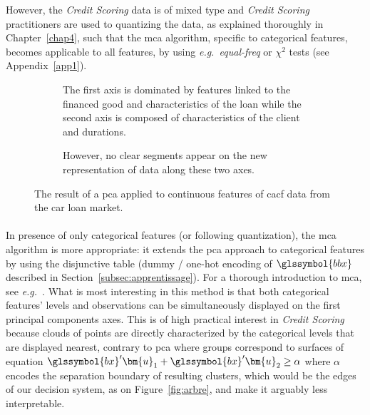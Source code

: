 However, the \textit{Credit Scoring} data is of mixed type and \textit{Credit Scoring} practitioners are used to quantizing the data, as explained thoroughly in Chapter~\ref{chap4}, such that the \gls{mca} algorithm, specific to categorical features, becomes applicable to all features, by using \textit{e.g.\ equal-freq} or $\chi^2$ tests (see Appendix~\ref{app1}).

\begin{figure}[!htb]
{\setlength{\parindent}{0cm}}

\begin{multicols}{2}
\centering
\begin{subfigure}[t]{0.45\textwidth}
\centering
\resizebox{\textwidth}{!}{}
\caption{\label{fig:pca1} The first axis is dominated by features linked to the financed good and characteristics of the loan while the second axis is composed of characteristics of the client and durations.}
\end{subfigure}%
\columnbreak
\hspace*{1cm} \begin{subfigure}[t]{0.45\textwidth}
\centering
\resizebox{\textwidth}{!}{}
\caption{\label{fig:pca2} However, no clear segments appear on the new representation of data along these two axes.}
\end{subfigure}
\end{multicols}

\caption{\label{fig:pca} The result of a \gls{pca} applied to continuous features of \gls{cacf} data from the car loan market.}
\end{figure}

\paragraph{}

In presence of only categorical features (or following quantization), the \gls{mca} algorithm is more appropriate: it extends the \gls{pca} approach to categorical features by using the disjunctive table (dummy / one-hot encoding of $\glssymbol{bbx}$ described in Section~\ref{subsec:apprentissage}). For a thorough introduction to \gls{mca}, see \textit{e.g.}~\cite{lebart1995statistique}. What is most interesting in this method is that both categorical features' levels and observations can be simultaneously displayed on the first principal components axes.
This is of high practical interest in \textit{Credit Scoring} because clouds of points are directly characterized by the categorical levels that are displayed nearest, contrary to \gls{pca} where groups correspond to surfaces of equation $\glssymbol{bx} ' \bm{u}_1 + \glssymbol{bx} ' \bm{u}_2 \geq \alpha$ where $\alpha$ encodes the separation boundary of resulting clusters, which would be the edges of our decision system, as on Figure~\ref{fig:arbre}, and make it arguably less interpretable.

